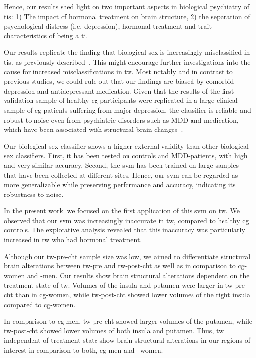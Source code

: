 \documentclass{article}
\begin{document}
    Hence, our results shed light on two important aspects in biological psychiatry of \acp{ti}: 1) The impact of hormonal treatment on brain structure, 2) the separation of psychological distress (i.e. depression), hormonal treatment and trait characteristics of being a \ac{ti}.

    Our results replicate the finding that biological sex is increasingly misclassified in \acp{ti}, as previously described~\cite{Hoekzema2015, Baldinger-Melich2019}. This might encourage further investigations into the cause for increased misclassifications in \ac{tw}. Most notably and in contrast to previous studies, we could rule out that our findings are biased by comorbid depression and antidepressant medication. Given that the results of the first validation-sample of healthy \ac{cg}-participants were replicated in a large clinical sample of \ac{cg}-patients suffering from major depression, the classifier is reliable and robust to noise even from psychiatric disorders such as MDD and medication, which have been associated with structural brain changes~\cite{Redlich2018,Zaremba2018}.

    Our biological sex classifier shows a higher external validity than other biological sex classifiers. First, it has been tested on controls and MDD-patients, with high and very similar accuracy. Second, the \ac{svm} has been trained on large samples that have been collected at different sites. Hence, our \ac{svm} can be regarded as more generalizable while preserving performance and accuracy, indicating its robustness to noise.

    In the present work, we focused on the first application of this \ac{svm} on \ac{tw}. We observed that our \ac{svm} was increasingly inaccurate in \ac{tw}, compared to healthy \ac{cg} controls. The explorative analysis revealed that this inaccuracy was particularly increased in \ac{tw} who had hormonal treatment.

    Although our \ac{tw}-pre-\ac{cht} sample size was low, we aimed to differentiate structural brain alterations between \ac{tw}-pre and \ac{tw}-post-\ac{cht} as well as in comparison to \ac{cg}-women and -men. Our results show brain structural alterations dependent on the treatment state of \ac{tw}.
    Volumes of the insula and putamen were larger in \ac{tw}-pre-\ac{cht} than in \ac{cg}-women, while \ac{tw}-post-\ac{cht} showed lower volumes of the right insula compared to \ac{cg}-women.

    In comparison to \ac{cg}-men, \ac{tw}-pre-\ac{cht} showed larger volumes of the putamen, while \ac{tw}-post-\ac{cht} showed lower volumes of both insula and putamen. Thus, \ac{tw} independent of treatment state show brain structural alterations in our regions of interest in comparison to both, \ac{cg}-men and –women.
\end{document}
